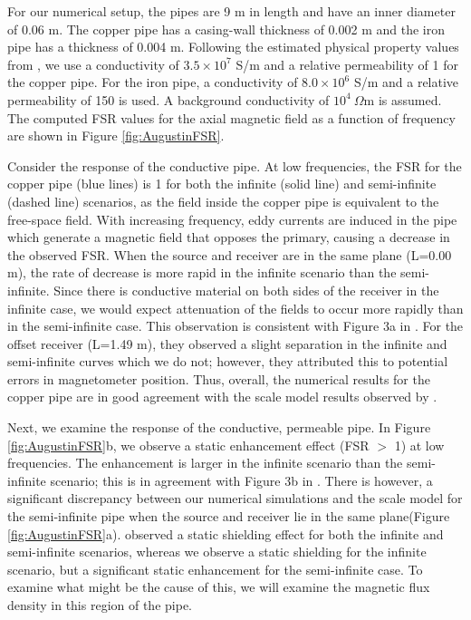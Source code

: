 \documentclass[preprint,review,3p,times,onecolumn,authoryear]{elsarticle}
\begin{document}
For our numerical setup, the pipes are 9 m in length and have an inner diameter of 0.06 m. The copper pipe has a casing-wall thickness of 0.002 m and the iron pipe has a thickness of 0.004 m. Following the estimated physical property values from \cite{Augustin1989}, we use a conductivity of $3.5 \times 10^7$ S/m and a relative permeability of 1 for the copper pipe. For the iron pipe, a conductivity of $8.0 \times 10^6$ S/m and a relative permeability of 150 is used. A background conductivity of $10^4 ~\Omega$m is assumed. The computed FSR values for the axial magnetic field as a function of frequency are shown in Figure \ref{fig:AugustinFSR}.




Consider the response of the conductive pipe. At low frequencies, the FSR for the copper pipe (blue lines) is 1 for both the infinite (solid line) and semi-infinite (dashed line) scenarios, as the field inside the copper pipe is equivalent to the free-space field. With increasing frequency, eddy currents are induced in the pipe which generate a magnetic field that opposes the primary, causing a decrease in the observed FSR. When the source and receiver are in the same plane (L=0.00 m), the rate of decrease is more rapid in the infinite scenario than the semi-infinite. Since there is conductive material on both sides of the receiver in the infinite case, we would expect attenuation of the fields to occur more rapidly than in the semi-infinite case. This observation is consistent with Figure 3a in \cite{Augustin1989}. For the offset receiver (L=1.49 m), they observed a slight separation in the infinite and semi-infinite curves which we do not; however, they attributed this to potential errors in magnetometer position. Thus, overall, the numerical results for the copper pipe are in good agreement with the scale model results observed by \cite{Augustin1989}.

Next, we examine the response of the conductive, permeable pipe. In Figure \ref{fig:AugustinFSR}b, we observe a static enhancement effect (FSR $>$ 1) at low frequencies. The enhancement is larger in the infinite scenario than the semi-infinite scenario; this is in agreement with Figure 3b in \cite{Augustin1989}. There is however, a significant discrepancy between our numerical simulations and the scale model for the semi-infinite pipe when the source and receiver lie in the same plane(Figure \ref{fig:AugustinFSR}a). \cite{Augustin1989} observed a static shielding effect for both the infinite and semi-infinite scenarios, whereas we observe a static shielding for the infinite scenario, but a significant static enhancement for the semi-infinite case. To examine what might be the cause of this, we will examine the magnetic flux density in this region of the pipe.
\end{document}
